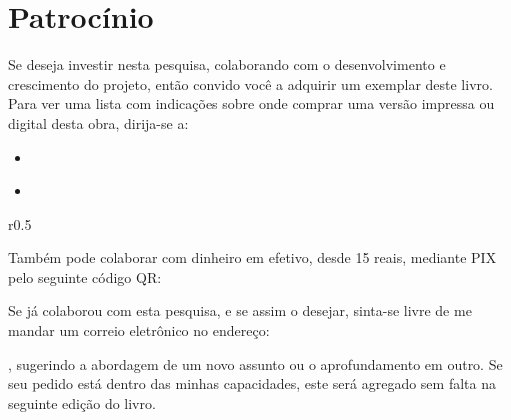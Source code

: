 \cleardoublepage
\pagestyle{empty}



\chapter*{Patrocínio}

\vfill


\begin{tcolorbox}[colback = colorPatrocinio, colframe = colorPatrocinio!80!black]%
    Se deseja investir nesta pesquisa, colaborando com o desenvolvimento e crescimento do projeto,
    então convido você a adquirir um exemplar deste livro. 
    Para ver uma lista com indicações sobre onde comprar uma versão impressa ou digital desta obra, dirija-se a: 
    \begin{itemize}
    \item \ImprimirLinkCompraLivroImpresso 
    \item \ImprimirLinkCompraLivroDigital \\ 
    \end{itemize}

    \begin{wrapfigure}{r}{0.5\textwidth}
    \vspace{-20pt}
    \centering\ImprimirLinkMetodoPagoA
    \end{wrapfigure}
    Também pode colaborar com dinheiro em efetivo, desde 15 reais,  
    mediante PIX pelo seguinte código QR:
    
    
    Se já colaborou com esta pesquisa, e se assim o desejar, 
    sinta-se livre de me mandar um correio eletrônico no endereço: 
    
    \ImprimirEmail, 
    sugerindo a abordagem de um novo assunto ou o aprofundamento em outro.
    Se seu pedido está dentro das minhas capacidades, 
    este será agregado sem falta na seguinte edição do livro.

    \begin{flushright}
    \myauthor ~
    \end{flushright}
\end{tcolorbox}%

\vfill

